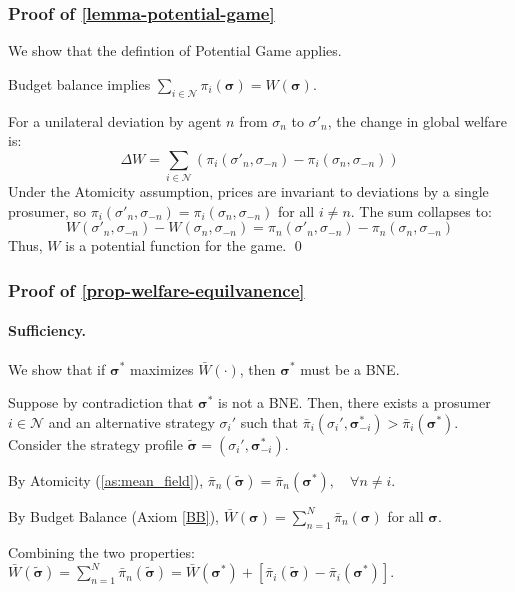 \documentclass[12pt, notitlepage]{article}
\begin{document}
\subsubsection*{Proof of \cref{lemma-potential-game}}

We show that the defintion of Potential Game applies. 

Budget balance implies $\sum_{i \in \mathcal{N}} \pi_i(\boldsymbol{\sigma}) = W(\boldsymbol{\sigma})$. 

For a unilateral deviation by agent $n$ from $\sigma_n$ to $\sigma'_n$, the change in global welfare is:
    $$
        \Delta W = \sum_{i \in \mathcal{N}} (\pi_i(\sigma'_n, \sigma_{-n}) - \pi_i(\sigma_n, \sigma_{-n}))
$$    
Under the Atomicity assumption, prices are invariant to deviations by a single prosumer, so $\pi_i(\sigma'_n, \sigma_{-n}) = \pi_i(\sigma_n, \sigma_{-n})$ for all $i \neq n$. The sum collapses to:
$$    
        W(\sigma'_n, \sigma_{-n}) - W(\sigma_n, \sigma_{-n}) = \pi_n(\sigma'_n, \sigma_{-n}) - \pi_n(\sigma_n, \sigma_{-n})
$$   
    Thus, $W$ is a potential function for the game.  \qed 

\subsubsection*{Proof of \cref{prop-welfare-equilvanence}}

\paragraph{Sufficiency.} We show that if \(\boldsymbol{\sigma}^*\) maximizes \(\bar{W}(\cdot)\), then  \(\boldsymbol{\sigma}^*\) must be a BNE.  \medskip{}

\noindent{}Suppose by contradiction that \(\boldsymbol{\sigma}^*\) is not a BNE. Then, there exists a prosumer \(i \in \mathcal{N}\) and an alternative strategy \(\sigma_i'\) such that  $\bar{\pi}_i(\sigma_i', \boldsymbol{\sigma}_{-i}^*) > \bar{\pi}_i(\boldsymbol{\sigma}^*).  $  Consider the strategy profile \(\tilde{\boldsymbol{\sigma}} = (\sigma_i', \boldsymbol{\sigma}_{-i}^*)\). 

By Atomicity  (\cref{as:mean_field}), $\bar{\pi}_n(\tilde{\boldsymbol{\sigma}}) = \bar{\pi}_n(\boldsymbol{\sigma}^*), \quad \forall n \neq i.$  

By Budget Balance (Axiom \ref{BB}), $\bar{W}(\boldsymbol{\sigma}) =  \sum_{n=1}^N \bar{\pi}_n(\boldsymbol{\sigma})$ for all $\boldsymbol{\sigma}$.

Combining the two properties: $\bar{W}(\tilde{\boldsymbol{\sigma}}) =  \sum_{n=1}^N \bar{\pi}_n(\tilde{\boldsymbol{\sigma}})  =  \bar{W}(\boldsymbol{\sigma}^*) + \left[ \bar{\pi}_i(\tilde{\boldsymbol{\sigma}}) - \bar{\pi}_i(\boldsymbol{\sigma}^*) \right].$ 
\end{document}
